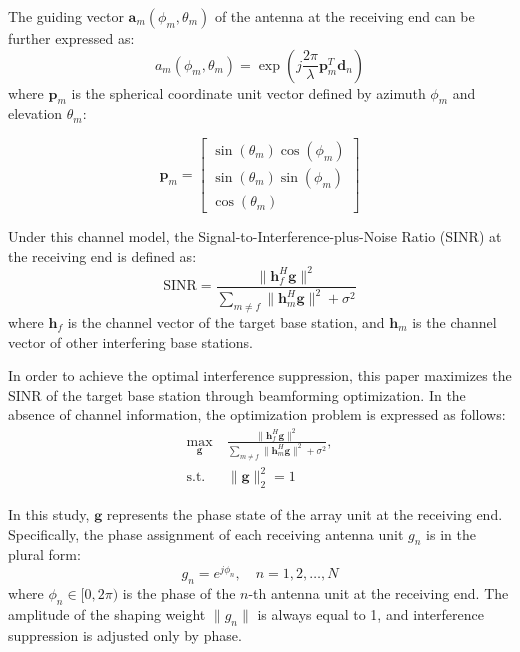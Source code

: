 \documentclass[lettersize,journal]{IEEEtran}
\begin{document}
The guiding vector \(\mathbf{a}_{m}\left( \phi_{m},\theta_{m} \right)\) of the antenna at the receiving end can be further expressed as:
\begin{equation}
  a_m(\phi_m, \theta_m) = \exp\left(j \frac{2 \pi}{\lambda} \mathbf{p}_m^{T} \mathbf{d}_n \right) \label{eq:guiding_vector}
\end{equation}
where \(\mathbf{p}_{m}\) is the spherical coordinate unit vector defined by azimuth \(\phi_{m}\) and elevation \(\theta_{m}\):

\begin{equation}
  \mathbf{p}_{m} = \begin{bmatrix}
    \sin\left( \theta_{m} \right) \cos\left( \phi_{m} \right) \\
    \sin\left( \theta_{m} \right) \sin\left( \phi_{m} \right) \\
    \cos\left( \theta_{m} \right)\label{eq:p_m}
  \end{bmatrix}
\end{equation}

Under this channel model, the Signal-to-Interference-plus-Noise Ratio (SINR) at the receiving end is defined as:
\begin{equation}
  \text{SINR} = \frac{\|\mathbf{h}_f^{H} \mathbf{g}\|^2}{\sum_{m \neq f} \|\mathbf{h}_m^{H} \mathbf{g}\|^2 + \sigma^2} \label{eq:SINR}
\end{equation}
where \(\mathbf{h}_{f}\) is the channel vector of the target base station, and \(\mathbf{h}_{m}\) is the channel vector of other interfering base stations.

In order to achieve the optimal interference suppression, this paper maximizes the SINR of the target base station through beamforming optimization. In the absence of channel information, the optimization problem is expressed as follows:
\begin{equation}
  \begin{aligned}
    \max_{\mathbf{g}}\  & \frac{\|\mathbf{h}_f^{H} \mathbf{g}\|^2}{\sum_{m \neq f} \|\mathbf{h}_m^{H} \mathbf{g}\|^2 + \sigma^2}, \\
    \text{s.t. }        & \|\mathbf{g}\|_2^2 = 1
  \end{aligned} \label{eq:optimization}
\end{equation}

In this study, \(\mathbf{g}\) represents the phase state of the array unit at the receiving end. Specifically, the phase assignment of each receiving antenna unit \(g_{n}\) is in the plural form:
\begin{equation}
  g_n = e^{j \phi_n}, \quad n = 1, 2, \dots, N \label{eq:phase_assignment}
\end{equation}
where \(\phi_{n} \in [0, 2\pi)\) is the phase of the \(n\)-th antenna unit at the receiving end. The amplitude of the shaping weight \(\|g_{n}\|\) is always equal to 1, and interference suppression is adjusted only by phase.
\end{document}
